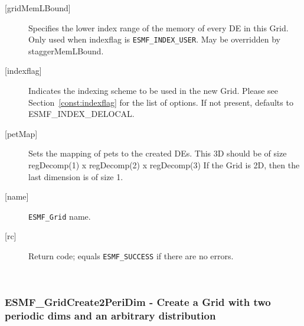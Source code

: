 \begin{description}
   \item[{[gridMemLBound]}]
        Specifies the lower index range of the memory of every DE in this Grid.
        Only used when indexflag is {\tt ESMF\_INDEX\_USER}. May be overridden
        by staggerMemLBound.
   \item[{[indexflag]}]
        Indicates the indexing scheme to be used in the new Grid. Please see
        Section~\ref{const:indexflag} for the list of options. If not present,
        defaults to ESMF\_INDEX\_DELOCAL.
   \item[{[petMap]}]
         Sets the mapping of pets to the created DEs. This 3D
         should be of size regDecomp(1) x regDecomp(2) x regDecomp(3)
         If the Grid is 2D, then the last dimension is of size 1.
   \item[{[name]}]
        {\tt ESMF\_Grid} name.
   \item[{[rc]}]
        Return code; equals {\tt ESMF\_SUCCESS} if there are no errors.
   \end{description}
   
 
\mbox{}\hrulefill\ 
 
\subsubsection [ESMF\_GridCreate2PeriDim] {ESMF\_GridCreate2PeriDim - Create a Grid with two periodic dims and an arbitrary distribution}


